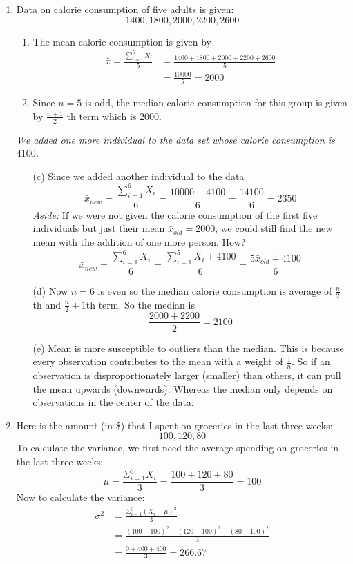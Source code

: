 \documentclass{./../../Latex/handout}
\begin{document}
\begin{enumerate}
\item Data on calorie consumption of five adults is given:
$$ 1400, 1800, 2000, 2200, 2600 $$
\begin{enumerate}
\item The mean calorie consumption is given by 
\begin{align*}
 \bar{x} = \frac{\sum_{i=1}^5 X_i}{5}  & = \frac{1400+1800+2000+2200+2600}{5} \\
 & = \frac{10000}{5} = 2000 
 \end{align*}
\item Since $n=5$ is odd, the median calorie consumption for this group is given by 
$ \frac{n+1}{2}$ th term which is 2000. 
\end{enumerate}
\textit{We added one more individual to the data set whose calorie consumption is $4100$.}
\begin{enumerate}
\item[(c)] Since we added another individual to the data 
$$  \bar{x}_{new} = \frac{\sum_{i=1}^6 X_i}{6} = \frac{10000+4100}{6} = \frac{14100}{6} = 2350 $$
\textit{Aside:} If we were not given the calorie consumption of the first five individuals but just their mean $\bar{x}_{old} = 2000$, we could still find the new mean with the addition of one more person. How?
$$ \bar{x}_{new} = \frac{\sum_{i=1}^6 X_i}{6} = \frac{\sum_{i=1}^5 X_i + 4100}{6} = \frac{5 \bar{x}_{old}  + 4100}{6}$$ 
\item[(d)]  Now $n=6$ is even so the median calorie consumption is average of $\frac{n}{2}$th and $\frac{n}{2}+1$th term. So the median is 
$$ \frac{2000+2200}{2} = 2100 $$
\item[(e)] Mean is more susceptible to outliers than the median. This is because every observation contributes to the mean with a weight of $\frac{1}{n}$. So if an observation is disproportionately larger (smaller) than others, it can pull the mean upwards (downwards). Whereas the median only depends on observations in the center of the data. 
\end{enumerate}

\item Here is the amount (in \$) that I spent on groceries in the last three weeks: 
$$ 100, 120, 80  $$
To calculate the variance, we first need the average spending on groceries in the last three weeks:
$$ \mu = \frac{\Sigma_{i=1}^3 X_i}{3} = \frac{100+120+80}{3} = 100 $$
Now to calculate the variance:
\begin{align*}
	\sigma^2 &= \frac{\Sigma_{i=1}^3 (X_i-\mu)^2}{3} \\
	&= \frac{(100-100)^2+(120-100)^2+(80-100)^2}{3} \\ 
	&= \frac{0+400+400}{3} = 266.67
\end{align*}


\end{enumerate}
\end{document}

